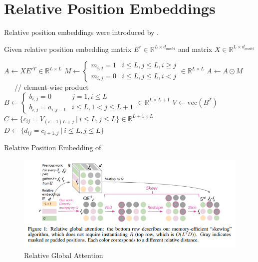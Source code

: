 \documentclass[11pt]{article}
\theoremstyle{definition}
\begin{document}
\section{Relative Position Embeddings}

Relative position embeddings were introduced by \cite{shaw2018selfattention}.

Given relative position embedding matrix $E^r \in \mathbb{R}^{L \times d_{model}}$ and matrix $X \in \mathbb{R}^{L \times d_{model}}$

\begin{algorithm}
\SetNoFillComment
{} 
$A \leftarrow XE^{rT} \in \mathbb{R}^{L \times L}$\;
$M \leftarrow \begin{cases} m_{i,j} = 1 & i \leq L, j \leq L, i \geq j \\ m_{i,j} = 0 & i \leq L, j \leq L, i < j \end{cases} \in \mathbb{R}^{L \times L}$\;
$A \leftarrow A \odot M$ \ \ \ // element-wise product\;
$B \leftarrow \begin{cases} b_{i,j} = 0 & j=1, i \leq L \\ b_{i,j} = a_{i,j-1} & i \leq L, 1 < j \leq L+1 \end{cases} \in \mathbb{R}^{L \times L+1}$\;
$V \leftarrow \mathrm{vec} (B^T)$\;
$C \leftarrow \{c_{ij} = V_{(i-1)L + j} \ | \ i \leq L, j \leq L \} \in \mathbb{R}^{L+1 \times L}$\;
$D \leftarrow \{d_{ij} = c_{i+1,j} \ | \ i \leq L, j \leq L\}$\;
\;
\caption{Relative Position Embedding of \cite{huang2018music}}\label{rel-pos-emb}
\end{algorithm}

\begin{figure}
\centering
  \includegraphics[width=\textwidth,height=\textheight,keepaspectratio]{transformers/relative_global_attention.png}
  \caption{Relative Global Attention \cite{huang2018music}}
  \label{fig:relative_global_attention}
\end{figure}
\end{document}
